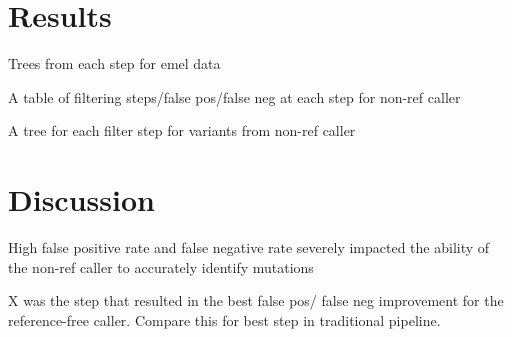 \documentclass{article}
\begin{document}
\section{Results}
\begin{outline}
	\item Trees from each step for emel data
	\item A table of filtering steps/false pos/false neg at each step for non-ref caller
	\item A tree for each filter step for variants from non-ref caller
\end{outline}

\section{Discussion}
\begin{outline}
	\item High false positive rate and false negative rate severely impacted the ability of the non-ref caller to accurately identify mutations
	\item X was the step that resulted in the best false pos/ false neg improvement for the reference-free caller. Compare this for best step in traditional pipeline.
\end{outline}

\end{document}
